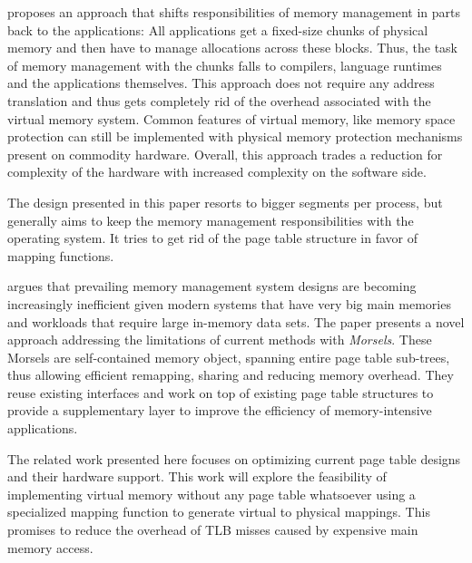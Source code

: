 
\cite{zagieboylo2020cost} proposes an approach that shifts responsibilities of memory management in
parts back to the applications: All applications get a fixed-size chunks of physical memory and then have to manage allocations across these blocks.
Thus, the task of memory management with the chunks falls to compilers, language runtimes and the applications themselves.
This approach does not require any address translation and thus gets completely rid of the overhead associated with the virtual memory system.
Common features of virtual memory, like memory space protection can still be implemented with physical memory protection mechanisms present on commodity hardware.
Overall, this approach trades a reduction for complexity of the hardware with increased complexity on the software side.

The design presented in this paper resorts to bigger segments per process, but generally aims to keep the memory management responsibilities with the operating system. It tries to get rid of the page table structure in favor of mapping functions.


\cite{halbuer2023morsels} argues that prevailing memory management system designs are becoming increasingly inefficient given modern systems that have very big main memories and workloads that require large in-memory data sets.
The paper presents a novel approach addressing the limitations of current methods with \emph{Morsels}.
These Morsels are self-contained memory object, spanning entire page table sub-trees, thus allowing efficient remapping, sharing and reducing memory overhead.
They reuse existing interfaces and work on top of existing page table structures to provide a supplementary layer to improve the efficiency of memory-intensive applications.


The related work presented here focuses on optimizing current page table designs and their hardware
support. This work will explore the feasibility of implementing virtual memory without any page table whatsoever using a specialized mapping function to generate virtual to physical mappings.
This promises to reduce the overhead of TLB misses caused by expensive main memory access.

